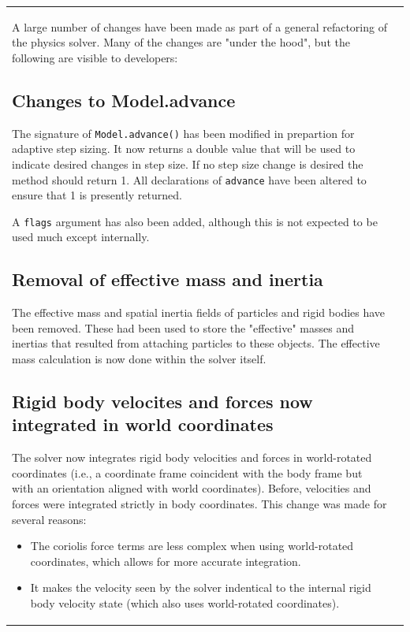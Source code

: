 \documentclass{article}
\begin{document}
\begin{tabular}{ll}
A large number of changes have been made as part of a general
refactoring of the physics solver. Many of the changes are "under the
hood", but the following are visible to developers:

\subsection*{Changes to Model.advance}

The signature of {\tt Model.advance()} has been modified in prepartion for
adaptive step sizing.  It now returns a double value that will be used
to indicate desired changes in step size. If no step size change is
desired the method should return 1.  All declarations of {\tt advance}
have been altered to ensure that 1 is presently returned.

A {\tt flags} argument has also been added, although this is not expected
to be used much except internally.

\subsection*{Removal of effective mass and inertia}

The effective mass and spatial inertia fields of particles and rigid
bodies have been removed. These had been used to store the "effective"
masses and inertias that resulted from attaching particles to these
objects.  The effective mass calculation is now done within the solver
itself.

\subsection*{Rigid body velocites and forces now integrated in world coordinates}

The solver now integrates rigid body velocities and forces in
world-rotated coordinates (i.e., a coordinate frame coincident with
the body frame but with an orientation aligned with world
coordinates).  Before, velocities and forces were integrated strictly
in body coordinates. This change was made for several reasons:

\begin{itemize}

\item The coriolis force terms are less complex when using world-rotated
  coordinates, which allows for more accurate integration.

\item It makes the velocity seen by the solver indentical to the internal
  rigid body velocity state (which also uses world-rotated
  coordinates).


\end{itemize}
\end{tabular}
\end{document}
